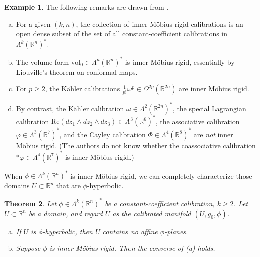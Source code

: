 \documentclass[11pt]{article}
\newcommand{\R}{\mathbb{R}}
\newcommand{\vol}{\mathrm{vol}}
\newtheorem{thm}{Theorem}[section]
\theoremstyle{definition}
\newtheorem{example}[thm]{Example}
\numberwithin{equation}{section}
\begin{document}
\begin{example} \label{ex:ConfRigid} The following remarks are drawn from \cite{ikonen2024liouville}.
\begin{enumerate}[(a)]
\item For a given $(k,n)$, the collection of inner M\"{o}bius rigid calibrations is an open dense subset of the set of all constant-coefficient calibrations in $\Lambda^k(\R^n)^*$.
\item The volume form $\vol_0 \in \Lambda^n(\R^n)^*$ is inner M\"{o}bius rigid, essentially by Liouville's theorem on conformal maps.
\item For $p \geq 2$, the K\"{a}hler calibrations $\frac{1}{p!}\omega^p \in \Omega^{2p}(\R^{2n})$ are inner M\"{o}bius rigid.
\item By contrast, the K\"{a}hler calibration $\omega \in \Lambda^2(\R^{2n})^*$, the special Lagrangian calibration $\mathrm{Re}(dz_1 \wedge dz_2 \wedge dz_3) \in \Lambda^3(\R^6)^*$, the associative calibration $\varphi \in \Lambda^3(\R^7)^*$, and the Cayley calibration $\Phi \in \Lambda^4(\R^8)^*$ are \emph{not} inner M\"{o}bius rigid.  (The authors do not know whether the coassociative calibration $\ast\varphi \in \Lambda^4(\R^7)^*$ is inner M\"{o}bius rigid.)
\end{enumerate}
\end{example}

\indent When $\phi \in \Lambda^k(\R^n)^*$ is inner M\"{o}bius rigid, we can completely characterize those domains $U \subset \R^n$ that are $\phi$-hyperbolic.

\begin{thm} \label{prop:ConfRigid} Let $\phi \in \Lambda^k(\R^n)^*$ be a constant-coefficient calibration, $k \geq 2$.  Let $U \subset \R^n$ be a domain, and regard $U$ as the calibrated manifold $(U, g_0, \phi)$.
\begin{enumerate}[(a)]
\item If $U$ is $\phi$-hyperbolic, then $U$ contains no affine $\phi$-planes.
\item Suppose $\phi$ is inner M\"{o}bius rigid.  Then the converse of (a) holds.
\end{enumerate}
\end{thm}
\end{document}
